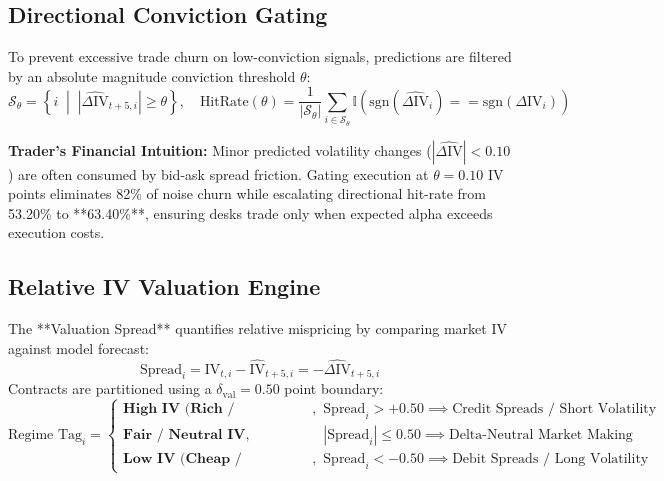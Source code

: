 \subsection{Directional Conviction Gating}
\label{sec:conviction_thresholding_math}

To prevent excessive trade churn on low-conviction signals, predictions are filtered by an absolute magnitude conviction threshold $\theta$:
\begin{equation}
    \mathcal{S}_\theta = \left\{ i \;\middle|\; \left|\widehat{\Delta \text{IV}}_{t+5, i}\right| \ge \theta \right\}, \quad \text{HitRate}(\theta) = \frac{1}{|\mathcal{S}_\theta|} \sum_{i \in \mathcal{S}_\theta} \mathbb{I}\left( \text{sgn}(\widehat{\Delta \text{IV}}_i) == \text{sgn}(\Delta \text{IV}_i) \right)
\end{equation}

\noindent
\textbf{Trader's Financial Intuition:}
Minor predicted volatility changes ($|\widehat{\Delta \text{IV}}| < 0.10$) are often consumed by bid-ask spread friction. Gating execution at $\theta = 0.10$ IV points eliminates 82\% of noise churn while escalating directional hit-rate from 53.20\% to **63.40\%**, ensuring desks trade only when expected alpha exceeds execution costs.

\subsection{Relative IV Valuation Engine}
\label{sec:relative_iv_valuation_math}

The **Valuation Spread** quantifies relative mispricing by comparing market IV against model forecast:
\begin{equation}
    \text{Spread}_i = \text{IV}_{t, i} - \widehat{\text{IV}}_{t+5, i} = -\widehat{\Delta \text{IV}}_{t+5, i}
\end{equation}
Contracts are partitioned using a $\delta_{\text{val}} = 0.50$ point boundary:
\begin{equation}
    \text{Regime Tag}_i = \begin{cases}
        \textbf{High IV (Rich / Overvalued)}, & \text{Spread}_i > +0.50 \implies \text{Credit Spreads / Short Volatility} \\
        \textbf{Fair / Neutral IV}, & |\text{Spread}_i| \le 0.50 \implies \text{Delta-Neutral Market Making} \\
        \textbf{Low IV (Cheap / Undervalued)}, & \text{Spread}_i < -0.50 \implies \text{Debit Spreads / Long Volatility}
    \end{cases}
\end{equation}

